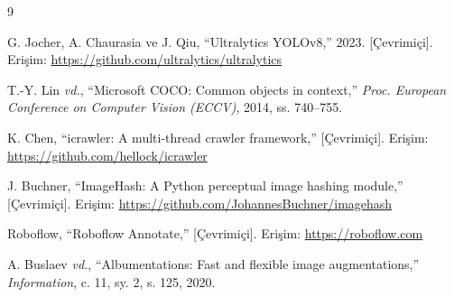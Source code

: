 \documentclass[conference]{IEEEtran}
\begin{document}
\begin{thebibliography}{9}

G. Jocher, A. Chaurasia ve J. Qiu, ``Ultralytics YOLOv8,'' 2023. [Çevrimiçi].
Erişim: \url{https://github.com/ultralytics/ultralytics}

T.-Y. Lin \emph{vd.}, ``Microsoft COCO: Common objects in context,'' \emph{Proc. European
Conference on Computer Vision (ECCV)}, 2014, ss. 740--755.

K. Chen, ``icrawler: A multi-thread crawler framework,'' [Çevrimiçi].
Erişim: \url{https://github.com/hellock/icrawler}

J. Buchner, ``ImageHash: A Python perceptual image hashing module,'' [Çevrimiçi].
Erişim: \url{https://github.com/JohannesBuchner/imagehash}

Roboflow, ``Roboflow Annotate,'' [Çevrimiçi]. Erişim: \url{https://roboflow.com}

A. Buslaev \emph{vd.}, ``Albumentations: Fast and flexible image augmentations,''
\emph{Information}, c. 11, sy. 2, s. 125, 2020.

\end{thebibliography}
\end{document}
